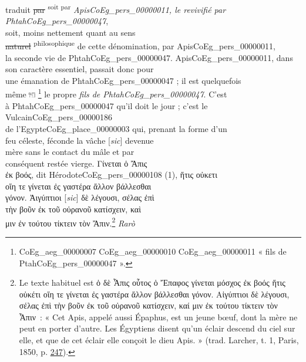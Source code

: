 \documentclass{book}
\begin{document}
{\begin{paracol}{2}
traduit \sout{par} \textsuperscript{soit par} \textit{Apis\gls{CoEg_pers_00000011}, le revivifié par Phtah\gls{CoEg_pers_00000047}},\\
soit, moins nettement quant au sens\\
\sout{naturel} \textsuperscript{philosophique} de cette dénomination, par Apis\gls{CoEg_pers_00000011},\\
la seconde vie de Phtah\gls{CoEg_pers_00000047}. Apis\gls{CoEg_pers_00000011}, dans\\
son caractère essentiel, passait donc pour\\
une émanation de Phtah\gls{CoEg_pers_00000047} ; il est quelquefois\\
même \includegraphics[height=6pt]{CoEg_Mariette_hiero_1857-04-01_9_2.png} \footnote{\foreignlanguage{translit}{\Gls{CoEg_aeg_00000007} \gls{CoEg_aeg_00000010} \gls{CoEg_aeg_00000011}} « fils de Ptah\gls{CoEg_pers_00000047} ».} le propre \textit{fils de Phtah\gls{CoEg_pers_00000047}}. C’est\\
à Phtah\gls{CoEg_pers_00000047} qu’il doit le jour ; c’est le Vulcain\gls{CoEg_pers_00000186}\\
de l’Egypte\gls{CoEg_place_00000003} qui, prenant la forme d’un\\
feu céleste, féconde la vâche [\textit{sic}] devenue\\
mère sans le contact du mâle et par\\
conséquent restée vierge. Γίνεται ὁ Ἄπις\\
ἐκ βοός, dit Hérodote\gls{CoEg_pers_00000108} (1), ἥτις οὐκετι\\
οἵη τε γίνεται ἐς γαστέρα ἄλλον βάλλεσθαι\\
γόνον. Ἀιγύπτιοι [\textit{sic}] δὲ λέγουσι, σέλας ἐπὶ\\
τὴν βοῦν ἐκ τοῦ οὐρανοῦ κατίσχειν, καὶ\\
μιν ἐν τούτου τίκτειν τὸν Ἄπιν.\footnote{Le texte habituel est ὁ δὲ Ἆπις οὗτος ὁ Ἔπαφος γίνεται μόσχος ἐκ βοός ἥτις οὐκέτι οἵη τε γίνεται ἐς γαστέρα ἄλλον βάλλεσθαι γόνον. Αἰγύπτιοι δὲ λέγουσι, σέλας ἐπὶ τὴν βοῦν ἐκ τοῦ οὐρανοῦ κατίσχειν, καί μιν ἐκ τούτου τίκτειν τὸν Ἆπιν~: « Cet Apis, appelé aussi Épaphus, est un jeune bœuf, dont la mère ne peut en porter d’autre. Les Égyptiens disent qu’un éclair descend du ciel sur elle, et que de cet éclair elle conçoit le dieu Apis. » (trad. Larcher, t. 1, Paris, 1850, p. \href{https://gallica.bnf.fr/ark:/12148/bpt6k203223n/f246.item}{247}).} \textit{Rarò\\
}
\end{paracol}}
\end{document}
